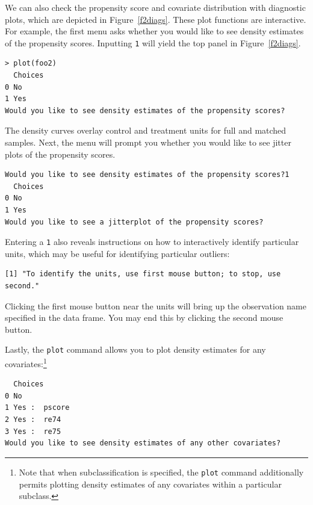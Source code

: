 \documentclass[oneside,letterpaper,titlepage]{article}
\begin{document}
We can also check the propensity score and covariate distribution with
diagnostic plots, which are depicted in Figure~\ref{f2diags}.  These
plot functions are interactive.  For example, the first menu asks
whether you would like to see density estimates of the propensity
scores.  Inputting \texttt{1} will yield the top panel in
Figure~\ref{f2diags}.

\begin{verbatim}
> plot(foo2)
  Choices
0 No     
1 Yes    
Would you like to see density estimates of the propensity scores?
\end{verbatim}

The density curves overlay control and treatment units for full and
matched samples.  Next, the menu will prompt you whether you would
like to see jitter plots of the propensity scores.

\begin{verbatim}
Would you like to see density estimates of the propensity scores?1
  Choices
0 No     
1 Yes    
Would you like to see a jitterplot of the propensity scores?
\end{verbatim}

Entering a \texttt{1} also reveals instructions on how to
interactively identify particular units, which may be useful for
identifying particular outliers:

\begin{verbatim}
[1] "To identify the units, use first mouse button; to stop, use
second."
\end{verbatim}

Clicking the first mouse button near the units will bring up the
observation name specified in the data frame.  You may end this by
clicking the second mouse button.

Lastly, the \texttt{plot} command allows you to plot density estimates
for any covariates:\footnote{Note that when subclassification is
  specified, the \texttt{plot} command additionally permits plotting
  density estimates of any covariates within a particular subclass.}

\begin{verbatim}
  Choices         
0 No              
1 Yes :  pscore   
2 Yes :  re74     
3 Yes :  re75     
Would you like to see density estimates of any other covariates?
\end{verbatim}
\end{document}
